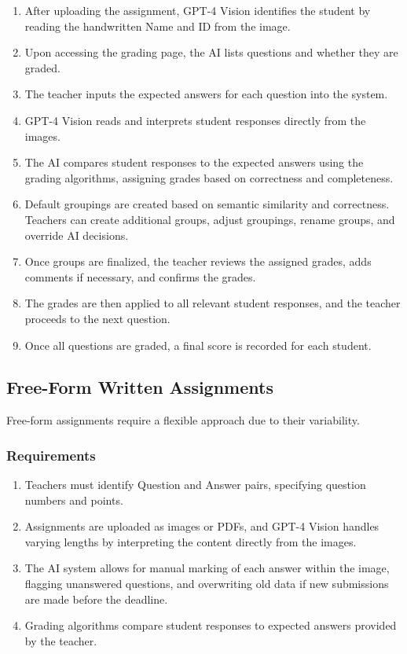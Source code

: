 \documentclass[ms,twoside,print]{nuthesis}
\begin{document}
\begin{enumerate}
    \item After uploading the assignment, GPT-4 Vision identifies the student by reading the handwritten Name and ID from the image.
    \item Upon accessing the grading page, the AI lists questions and whether they are graded.
    \item The teacher inputs the expected answers for each question into the system.
    \item GPT-4 Vision reads and interprets student responses directly from the images.
    \item The AI compares student responses to the expected answers using the grading algorithms, assigning grades based on correctness and completeness.
    \item Default groupings are created based on semantic similarity and correctness. Teachers can create additional groups, adjust groupings, rename groups, and override AI decisions.
    \item Once groups are finalized, the teacher reviews the assigned grades, adds comments if necessary, and confirms the grades.
    \item The grades are then applied to all relevant student responses, and the teacher proceeds to the next question.
    \item Once all questions are graded, a final score is recorded for each student.
\end{enumerate}

\subsection{Free-Form Written Assignments}

Free-form assignments require a flexible approach due to their variability.

\subsubsection{Requirements}

\begin{enumerate}
    \item Teachers must identify Question and Answer pairs, specifying question numbers and points.
    \item Assignments are uploaded as images or PDFs, and GPT-4 Vision handles varying lengths by interpreting the content directly from the images.
    \item The AI system allows for manual marking of each answer within the image, flagging unanswered questions, and overwriting old data if new submissions are made before the deadline.
    \item Grading algorithms compare student responses to expected answers provided by the teacher.
\end{enumerate}
\end{document}
